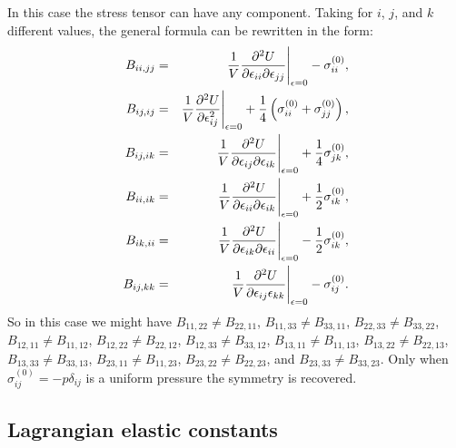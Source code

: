 \documentclass[12pt,a4paper,twoside]{report}
\begin{document}
In this case the stress tensor can have any component. 
Taking for $i$, $j$, and $k$ different values, the general formula can 
be rewritten in the form:
\begin{eqnarray}
B_{ii,jj} &=& {1 \over V}{\partial^2 U \over \partial \epsilon_{ii}
\partial \epsilon_{jj}}\Bigg|_{\epsilon=0} - \sigma^{(0)}_{ii}, \\
B_{ij,ij} &=& {1 \over V}{\partial^2 U \over \partial \epsilon_{ij}^2 
}\Bigg|_{\epsilon=0} + {1\over 4} \left(\sigma^{(0)}_{ii} 
+ \sigma^{(0)}_{jj}\right), \\
B_{ij,ik} &=& {1 \over V}{\partial^2 U \over \partial \epsilon_{ij} 
\partial \epsilon_{ik}}\Bigg|_{\epsilon=0} +{1\over 4}\sigma^{(0)}_{jk}, \\
B_{ii,ik} &=& {1 \over V}{\partial^2 U \over \partial \epsilon_{ii} 
\partial \epsilon_{ik}}\Bigg|_{\epsilon=0} +{1\over 2} \sigma^{(0)}_{ik}, \\
B_{ik,ii} &=& {1 \over V}{\partial^2 U \over \partial \epsilon_{ik} 
\partial \epsilon_{ii}}\Bigg|_{\epsilon=0} -{1\over 2} \sigma^{(0)}_{ik}, \\
B_{ij,kk} &=& {1 \over V}{\partial^2 U \over \partial \epsilon_{ij}
\epsilon_{kk} }\Bigg|_{\epsilon=0} - \sigma^{(0)}_{ij}. 
\end{eqnarray}
So in this case we might have $B_{11,22} \ne B_{22,11}$,
$B_{11,33} \ne B_{33,11}$, $B_{22,33} \ne B_{33,22}$,
$B_{12,11} \ne B_{11,12}$, $B_{12,22} \ne B_{22,12}$,
$B_{12,33} \ne B_{33,12}$, $B_{13,11} \ne B_{11,13}$, 
$B_{13,22} \ne B_{22,13}$, $B_{13,33} \ne B_{33,13}$,
$B_{23,11} \ne B_{11,23}$, $B_{23,22} \ne B_{22,23}$,
and $B_{23,33} \ne B_{33,23}$. Only when $\sigma^{(0)}_{ij}=
-p\delta_{ij}$ is a uniform pressure the symmetry is recovered.


{\color{web-blue} \subsection{Lagrangian elastic constants}}
\color{black}
\end{document}
